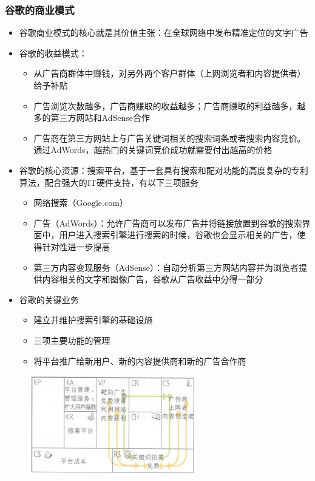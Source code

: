     \subsubsection{谷歌的商业模式}
    \begin{itemize}
        \item 谷歌商业模式的核心就是其价值主张：在全球网络中发布精准定位的文字广告
        \item 谷歌的收益模式：
        \begin{itemize}
            \item 从广告商群体中赚钱，对另外两个客户群体（上网浏览者和内容提供者）给予补贴
            \item 广告浏览次数越多，广告商赚取的收益越多；广告商赚取的利益越多，越多的第三方网站和AdSense合作
            \item 广告商在第三方网站上与广告关键词相关的搜索词条或者搜索内容竞价。通过AdWords，越热门的关键词竞价成功就需要付出越高的价格
        \end{itemize}
        \item 谷歌的核心资源：搜索平台，基于一套具有搜索和配对功能的高度复杂的专利算法，配合强大的IT硬件支持，有以下三项服务
        \begin{itemize}
            \item 网络搜索（Google.com）
            \item 广告（AdWords）：允许广告商可以发布广告并将链接放置到谷歌的搜索界面中，用户进入搜索引擎进行搜索的时候，谷歌也会显示相关的广告，使得针对性进一步提高
            \item 第三方内容变现服务（AdSense）：自动分析第三方网站内容并为浏览者提供内容相关的文字和图像广告，谷歌从广告收益中分得一部分
        \end{itemize}
        \item 谷歌的关键业务
        \begin{itemize}
            \item 建立并维护搜索引擎的基础设施
            \item 三项主要功能的管理
            \item 将平台推广给新用户、新的内容提供商和新的广告合作商
        \end{itemize}
    \end{itemize}

    \begin{figure}[H]
		\centering
        \vspace{-0.5em}
		\includegraphics[width=0.65\textwidth]{img/谷歌的商业模式.png}
        \vspace{-0.5em}
	\end{figure}


